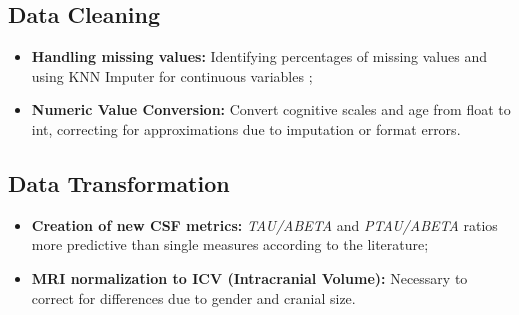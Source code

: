 \subsection{Data Cleaning}
\begin{itemize}
	\item \textbf{Handling missing values:} Identifying percentages of missing values and using KNN Imputer for continuous variables ;
	\item \textbf{Numeric Value Conversion:} Convert cognitive scales and age from float to int, correcting for approximations due to imputation or format errors.
\end{itemize}

\subsection{Data Transformation}
\begin{itemize}
	\item \textbf{Creation of new CSF metrics:} \textit{TAU/ABETA} and \textit{PTAU/ABETA} ratios more predictive than single measures according to the literature;
	\item \textbf{MRI normalization to ICV (Intracranial Volume):}
	Necessary to correct for differences due to gender and cranial size.
\end{itemize}

